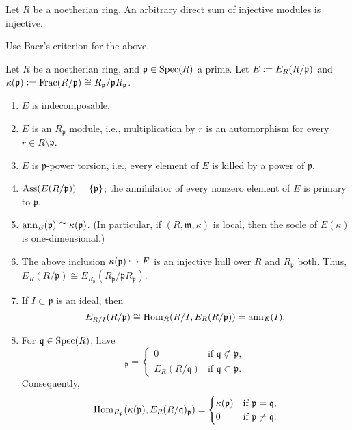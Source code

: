 \documentclass[12pt]{article}
\begin{document}
\begin{cor}
	Let $R$ be a noetherian ring. An arbitrary direct sum of injective modules is injective.
\end{cor}
Use Baer's criterion for the above.

\begin{thm} \label{thm:facts-about-E-R-P}
	Let $R$ be a noetherian ring, and $\mathfrak{p} \in \operatorname{Spec}(R)$ a prime. Let $E \vcentcolon= E_{R}(R/\mathfrak{p})$ and $\kappa(\mathfrak{p}) \vcentcolon= \operatorname{Frac}(R/\mathfrak{p}) \cong R_{\mathfrak{p}}/\mathfrak{p} R_{\mathfrak{p}}$.
	\begin{enumerate}[label=(\alph*)]
		\item $E$ is indecomposable.
		\item $E$ is an $R_{\mathfrak{p}}$ module, i.e., multiplication by $r$ is an automorphism for every $r \in R \setminus \mathfrak{p}$.
		\item $E$ is $\mathfrak{p}$-power torsion, i.e., every element of $E$ is killed by a power of $\mathfrak{p}$.
		\item $\operatorname{Ass}(E(R/\mathfrak{p})) = \{\mathfrak{p}\}$; the annihilator of every nonzero element of $E$ is primary to $\mathfrak{p}$.
		\item $\operatorname{ann}_{E}(\mathfrak{p}) \cong \kappa(\mathfrak{p})$. (In particular, if $(R, \mathfrak{m}, \kappa)$ is local, then the socle of $E(\kappa)$ is one-dimensional.)
		\item The above inclusion $\kappa(\mathfrak{p}) \hookrightarrow E$ is an injective hull over $R$ and $R_{\mathfrak{p}}$ both. Thus, $E_{R}(R/\mathfrak{p}) \cong E_{R_{\mathfrak{p}}}(R_{\mathfrak{p}}/\mathfrak{p} R_{\mathfrak{p}})$.
		\item If $I \subset \mathfrak{p}$ is an ideal, then
		\begin{equation*} 
			E_{R/I}(R/\mathfrak{p}) \cong \operatorname{Hom}_{R}(R/I, E_{R}(R/\mathfrak{p})) = \operatorname{ann}_{E}(I). 
		\end{equation*}
		\item For $\mathfrak{q} \in \operatorname{Spec}(R)$, have
		\begin{equation*} 
			[E_{R}(R/\mathfrak{q})]_{\mathfrak{p}} = 
			\begin{cases}
				0 & \text{if } \mathfrak{q} \not\subset \mathfrak{p}, \\
				E_{R}(R/\mathfrak{q}) & \text{if } \mathfrak{q} \subset \mathfrak{p}.
			\end{cases}
		\end{equation*}
		Consequently,
		\begin{equation*} 
			\operatorname{Hom}_{R_{\mathfrak{p}}}(\kappa(\mathfrak{p}), E_{R}(R/\mathfrak{q})_{\mathfrak{p}}) = 
			\begin{cases}
				\kappa(\mathfrak{p}) & \text{if } \mathfrak{p} = \mathfrak{q}, \\
				0 & \text{if } \mathfrak{p} \neq \mathfrak{q}.
			\end{cases}
		\end{equation*}
	\end{enumerate}
\end{thm}
\end{document}
